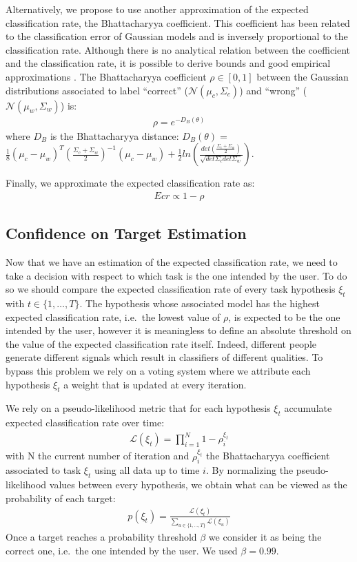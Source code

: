 \documentclass[letterpaper]{article}
\renewcommand{\L}{\mathcal{L}}
\begin{document}
Alternatively, we propose to use another approximation of the expected classification rate, the Bhattacharyya coefficient. This coefficient has been related to the classification error of Gaussian models \cite{Kailath67} and is inversely proportional to the classification rate. Although there is no analytical relation between the coefficient and the classification rate, it is possible to derive bounds and good empirical approximations \cite{lee2000bayes}.
%
The Bhattacharyya coefficient $\rho \in [0,1]$ between the Gaussian distributions associated to label ``correct'' ($\mathcal{N}(\mu_c, \Sigma_c)$) and ``wrong'' ($\mathcal{N}(\mu_w, \Sigma_w)$) is:
%
\begin{eqnarray}
\rho = e^{-D_B(\theta)}
\end{eqnarray}
%
where $D_B$ is the Bhattacharyya distance:
$D_B(\theta)=$\\$\frac{1}{8}(\mu_c-\mu_w)^T(\frac{\Sigma_c+\Sigma_w}{2})^{-1}(\mu_c-\mu_w)+\frac{1}{2}ln\left(\frac{det(\frac{\Sigma_c+\Sigma_w}{2})}{\sqrt{det\Sigma_c det\Sigma_w}}\right)$. 

Finally, we approximate the expected classification rate as: 
\begin{eqnarray}
Ecr \propto 1 - \rho
\end{eqnarray}


\subsection{Confidence on Target Estimation}

Now that we have an estimation of the expected classification rate, we need to take a decision with respect to which task is the one intended by the user. To do so we should compare the expected classification rate of every task hypothesis $\xi_t$ with $t \in \{1, \ldots, T\}$. The hypothesis whose associated model has the highest expected classification rate, i.e.\ the lowest value of $\rho$, is expected to be the one intended by the user, however it is meaningless to define an absolute threshold on the value of the expected classification rate itself. Indeed, different people generate different signals which result in classifiers of different qualities. To bypass this problem we rely on a voting system where we attribute each hypothesis $\xi_t$ a weight that is updated at every iteration.

We rely on a pseudo-likelihood metric that for each hypothesis $\xi_t$ accumulate expected classification rate over time:
%
\begin{eqnarray}
\L(\xi_t) = \prod_{i = 1}^{N} 1 - \rho_i^{\xi_t}
\end{eqnarray}
%
with N the current number of iteration and $\rho_i^{\xi_t}$ the Bhattacharyya coefficient associated to task $\xi_t$ using all data up to time $i$. By normalizing the pseudo-likelihood values between every hypothesis, we obtain what can be viewed as the probability of each target:
%
\begin{eqnarray}
p(\xi_t) = \frac{\L(\xi_t)}{\sum_{u \in \{1, \ldots, T\}} \L(\xi_u)}
\end{eqnarray}
%
Once a target reaches a probability threshold $\beta$ we consider it as being the correct one, i.e.\ the one intended by the user. We used $\beta = 0.99$.
\end{document}
